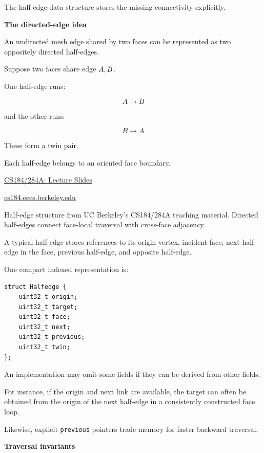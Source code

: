 The half-edge data structure stores the missing connectivity explicitly.

\textbf{The directed-edge idea}

An undirected mesh edge shared by two faces can be represented as two oppositely directed half-edges.

Suppose two faces share edge \(\\{A,B\\}\).

One half-edge runs:

\[
A\rightarrow B
\]

and the other runs:

\[
B\rightarrow A
\]

These form a twin pair.

Each half-edge belongs to an oriented face boundary.

\href{https://images.openai.com/static-rsc-4/LdXoMoReUJDWQboTFXVax9msgYiH4uAONkFXepPt9uBAax1LtEbQnjRwODfP4xjW6xhyN2dqUlCjk4_q5ugu0OYA8ggDScUVP5zv9ajTYRBc4W7Y_7wK4JjygNR75J6KtdaA5pZ5rI45muKmzksWb0_Y8eLucg-e4t2K7mYP_l0?purpose=inline}{CS184/284A: Lecture Slides}

\href{https://cs184.eecs.berkeley.edu/sp24/lecture/8-24/mesh-processing-and-geometry-pro?utm_source=chatgpt.com}{cs184.eecs.berkeley.edu}

Half-edge structure from UC Berkeley's CS184/284A teaching material. Directed half-edges connect face-local traversal with cross-face adjacency.

A typical half-edge stores references to its origin vertex, incident face, next half-edge in the face, previous half-edge, and opposite half-edge.

One compact indexed representation is:

\begin{verbatim}
struct Halfedge {
    uint32_t origin;
    uint32_t target;
    uint32_t face;
    uint32_t next;
    uint32_t previous;
    uint32_t twin;
};
\end{verbatim}

An implementation may omit some fields if they can be derived from other fields.

For instance, if the origin and next link are available, the target can often be obtained from the origin of the next half-edge in a consistently constructed face loop.

Likewise, explicit \texttt{previous} pointers trade memory for faster backward traversal.

\textbf{Traversal invariants}

